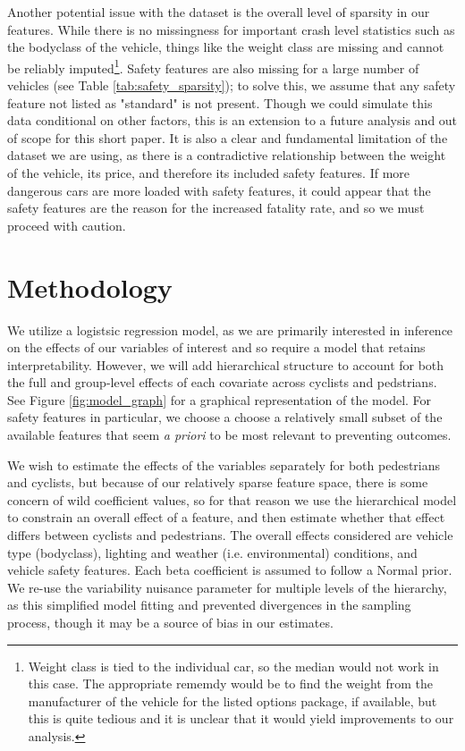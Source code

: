 \documentclass[12pt]{article}
\begin{document}
Another potential issue with the dataset is the overall level of sparsity in our features. While there is no
missingness for important crash level statistics such as the bodyclass of the vehicle, things like the weight class
are missing and cannot be reliably imputed\footnote{
    Weight class is tied to the individual car, so the median would not work in this case. The appropriate rememdy would be to  
    find the weight from the manufacturer of the vehicle for the listed options package, if available, but this is quite 
    tedious and it is unclear that it would yield improvements to our analysis.}. 
Safety features are also missing for a large number of vehicles (see Table \ref{tab:safety_sparsity}); to solve
this, we assume that any safety feature not listed as "standard" is not present. Though we could simulate this data
conditional on other factors, this is an extension to a future analysis and out of scope for this short paper. It is 
also a clear and fundamental limitation of the dataset we are using, as there is a contradictive relationship between
the weight of the vehicle, its price, and therefore its included safety features. If more dangerous cars are more loaded
with safety features, it could appear that the safety features are the reason for the increased fatality rate, and so
we must proceed with caution.

\section{Methodology}

We utilize a logistsic regression model, as we are primarily interested in inference on the
effects of our variables of interest and so require a model that retains interpretability. However, we will
add hierarchical structure to account for both the full and group-level effects of each covariate across
cyclists and pedstrians. See Figure \ref{fig:model_graph} for a graphical representation of the model. For safety
features in particular, we choose a choose a relatively small subset of the available features that seem 
\textit{a priori} to be most relevant to preventing outcomes. 

We wish to estimate the effects of the variables separately for both pedestrians and cyclists, but because of our
relatively sparse feature space, there is some concern of wild coefficient values, so for that reason we use the
hierarchical model to constrain an overall effect of a feature, and then estimate whether that effect differs
between cyclists and pedestrians. The overall effects considered are vehicle type (bodyclass), lighting and weather
(i.e. environmental) conditions, and vehicle safety features. Each beta coefficient is assumed to follow a Normal prior. 
We re-use the variability nuisance parameter for multiple levels of the hierarchy, as this simplified model fitting and 
prevented divergences in the sampling process, though it may be a source of bias in our estimates.
\end{document}
